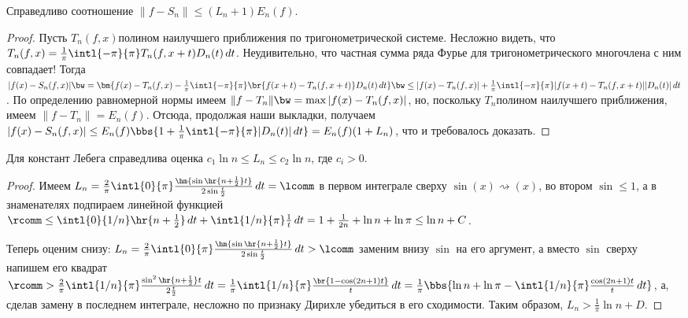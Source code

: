 \documentclass[a4paper]{article}
\newcommand{\intlop}{\intl{0}{\pi}}
\newcommand{\intlpp}{\intl{-\pi}{\pi}}
\newcommand{\frpi}{\frac{1}{\pi}}
\begin{document}
\begin{theorem}[Лебега]
Справедливо соотношение $\|f - S_n\| \le (L_n + 1)E_n(f)$.
\end{theorem}
\begin{proof}
Пусть $T_n(f,x)$\т полином наилучшего приближения по тригонометрической системе. Несложно видеть,
что $T_n(f,x) = \frpi \intlpp T_n(f,x+t)D_n(t)\,d t$. Неудивительно, что частная сумма ряда Фурье
для тригонометрического многочлена с ним совпадает! Тогда $|f(x) - S_n(f,x)| \bw= \bm{f(x) - T_n(f,x)
- \frpi \intlpp\br{f(x+t)-T_n(f,x+t)}D_n(t)\,d t} \bw\le |f(x) - T_n(f,x)| + \frpi \intlpp|f(x+t) -
T_n(f,x+t)||D_n(t)|\,d t$. По определению равномерной нормы имеем $\|f - T_n\| \bw= \max |f(x) -
T_n(f,x)|$, но, поскольку $T_n$\т полином наилучшего приближения, имеем $\|f - T_n\| = E_n(f)$.
Отсюда, продолжая наши выкладки, получаем $|f(x) - S_n(f,x)| \le E_n(f)\bbs{1 + \frpi
\intlpp|D_n(t)|\,d t}= E_n(f)(1 + L_n)$, что и требовалось доказать.
\end{proof}

\begin{theorem}
Для констант Лебега справедлива оценка $c_1\ln n \le L_n \le c_2 \ln n$, где $c_i > 0$.
\end{theorem}
\begin{proof}
Имеем $L_n = \frac{2}{\pi}\intlop\frac{\hm{\sin\hr{n+\frac{1}{2}}t}}{2\sin \frac{t}{2}}\,d t =
\lcomm$ в первом интеграле сверху $\sin(x) \rightsquigarrow (x)$, во втором $\sin \le 1$, а в
знаменателях подпираем линейной функцией $\rcomm \le \intl{0}{1/n}\hr{n + \frac{1}{2}}\,d t +
\intl{1/n}{\pi}\frac{1}{t}\,d t = 1 + \frac{1}{2n} + \ln n + \ln \pi \le \ln n + C$.

Теперь оценим снизу: $L_n = \frac{2}{\pi}\intlop\frac{\hm{\sin\hr{n+\frac{1}{2}}t}}{2\sin
\frac{t}{2}}\,d t > \lcomm$ заменим внизу $\sin$ на его аргумент, а вместо $\sin$ сверху напишем
его квадрат $\rcomm > \frac{2}{\pi}\intl{1/n}{\pi}\frac{\sin^2\hr{n + \frac{1}{2}} t}{2
\frac{t}{2}}\,d t = \frpi \intl{1/n}{\pi}\frac{\br{1 - \cos(2n+1)t}}{t}\,d t = \frpi \bbs{\ln n +
\ln \pi - \intl{1/n}{\pi}\frac{\cos(2n+1)t}{t}\,d t}$, а, сделав замену в последнем интеграле,
несложно по признаку Дирихле убедиться в его сходимости. Таким образом, $L_n > \frpi \ln n + D$.
\end{proof}
\end{document}
